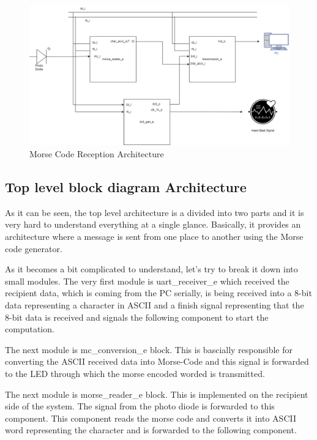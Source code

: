 \documentclass[12pt,a4paper]{article}
\begin{document}
\begin{figure}[H]
\centering
\includegraphics[scale=0.45]{MC_reception.drawio.png}
\caption{Morse Code Reception Architecture}
\label{Top Level Architecture}
\end{figure}
\newpage



\subsection{Top level block diagram Architecture}
As it can be seen, the top level architecture is a divided into two parts and it is very hard to understand everything at a single glance. Basically, it provides an architecture where a message is sent from one place to another using the Morse code generator. \

As it becomes a bit complicated to understand, let’s try to break it down into small modules. The very first module is uart\_receiver\_e which received the recipient data, which is coming from the PC serially, is being received into a 8-bit data representing a character in ASCII and a finish signal representing that the 8-bit data is received and signals the following component to start the computation.\
 
The next module is mc\_conversion\_e block. This is bascially responsible for converting the ASCII received data into Morse-Code and this signal is forwarded to the LED through which the morse encoded worded is transmitted.\

The next module is morse\_reader\_e block. This is implemented on the recipient side of the system. The signal from the photo diode is forwarded to this component. This component reads the morse code and converts it into ASCII word representing the character and is forwarded to the following component.\
\end{document}
